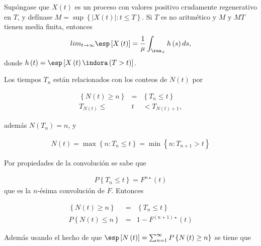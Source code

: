 \begin{Teo}
Sup\'ongase que $X\left(t\right)$ es un proceso con valores positivo crudamente regenerativo en $T$, y def\'inase $M=\sup\left\{|X\left(t\right)|:t\leq T\right\}$. Si $T$ es no aritm\'etico y $M$ y $MT$ tienen media finita, entonces
\begin{eqnarray*}
lim_{t\rightarrow\infty}\esp\left[X\left(t\right)\right]=\frac{1}{\mu}\int_{\rea_{+}}h\left(s\right)ds,
\end{eqnarray*}
donde $h\left(t\right)=\esp\left[X\left(t\right)\indora\left(T>t\right)\right]$.
\end{Teo}

%
%

Los tiempos $T_{n}$ est\'an relacionados con los conteos de $N\left(t\right)$ por

\begin{eqnarray*}
\left\{N\left(t\right)\geq n\right\}&=&\left\{T_{n}\leq t\right\}\\
T_{N\left(t\right)}\leq &t&<T_{N\left(t\right)+1},
\end{eqnarray*}

adem\'as $N\left(T_{n}\right)=n$, y 

\begin{eqnarray*}
N\left(t\right)=\max\left\{n:T_{n}\leq t\right\}=\min\left\{n:T_{n+1}>t\right\}
\end{eqnarray*}

Por propiedades de la convoluci\'on se sabe que

\begin{eqnarray*}
P\left\{T_{n}\leq t\right\}=F^{n\star}\left(t\right)
\end{eqnarray*}
que es la $n$-\'esima convoluci\'on de $F$. Entonces 

\begin{eqnarray*}
\left\{N\left(t\right)\geq n\right\}&=&\left\{T_{n}\leq t\right\}\\
P\left\{N\left(t\right)\leq n\right\}&=&1-F^{\left(n+1\right)\star}\left(t\right)
\end{eqnarray*}

Adem\'as usando el hecho de que $\esp\left[N\left(t\right)\right]=\sum_{n=1}^{\infty}P\left\{N\left(t\right)\geq n\right\}$
se tiene que

